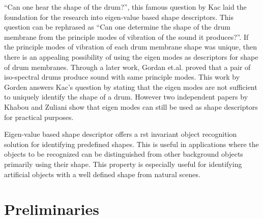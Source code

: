 \documentclass {udthesis}
\begin{document}
``Can one hear the shape of the drum?'', this famous question by Kac \cite{kac} laid the foundation for the research into eigen-value based shape descriptors.
This question can be rephrased as ``Can one determine the shape of the drum membrane from the principle modes of vibration of the sound it produces?''.
If the principle modes of vibration of each drum membrane shape was unique, then there is an appealing possibility of using the eigen modes as descriptors for shape of drum membranes. 
Through a later work, Gordan et.al.\cite{gordon} proved that a pair of iso-spectral drums produce sound with same principle modes. This work by Gorden answers Kac's question by stating that the eigen modes are not sufficient to uniquely identify the shape of a drum. However two independent papers by Khabou and Zuliani \cite{khabou,zuliani} show that eigen modes can still be used as shape descriptors for practical purposes.

Eigen-value based shape descriptor offers a \gls{rst} invariant object recognition solution for identifying predefined shapes. This is useful in applications where the objects to be recognized can be distinguished from other background objects primarily using their shape. This property is especially useful for identifying artificial objects with a well defined shape from natural scenes.


\section{Preliminaries}
\end{document}
